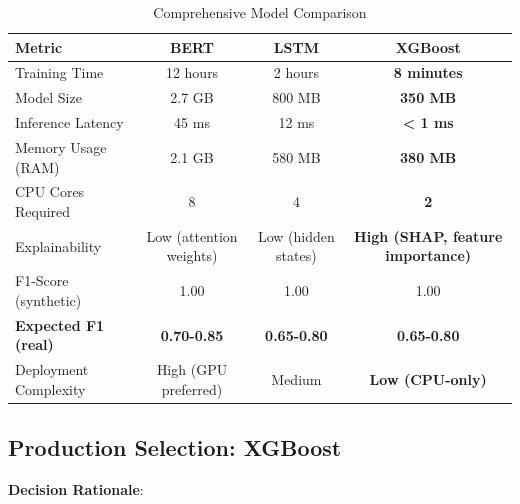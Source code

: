 \documentclass[11pt,conference]{IEEEtran}
\begin{document}
\begin{table}[h]
\centering
\caption{Comprehensive Model Comparison}
\begin{tabular}{lccc}
\toprule
\textbf{Metric} & \textbf{BERT} & \textbf{LSTM} & \textbf{XGBoost} \\
\midrule
Training Time & 12 hours & 2 hours & \textbf{8 minutes} \\
Model Size & 2.7 GB & 800 MB & \textbf{350 MB} \\
Inference Latency & 45 ms & 12 ms & \textbf{< 1 ms} \\
Memory Usage (RAM) & 2.1 GB & 580 MB & \textbf{380 MB} \\
CPU Cores Required & 8 & 4 & \textbf{2} \\
Explainability & Low (attention weights) & Low (hidden states) & \textbf{High (SHAP, feature importance)} \\
F1-Score (synthetic) & 1.00 & 1.00 & 1.00 \\
\textbf{Expected F1 (real)} & \textbf{0.70-0.85} & \textbf{0.65-0.80} & \textbf{0.65-0.80} \\
Deployment Complexity & High (GPU preferred) & Medium & \textbf{Low (CPU-only)} \\
\bottomrule
\end{tabular}
\end{table}

\subsection{Production Selection: XGBoost}

\textbf{Decision Rationale}:
\end{document}
